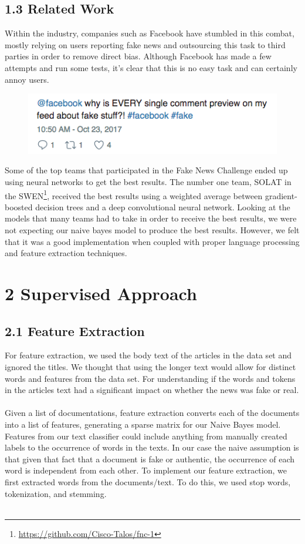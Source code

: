 \documentclass{neu_handout}
\begin{document}
\subsection*{1.3 Related Work}
Within the industry, companies such as Facebook have stumbled in this combat, mostly relying on users reporting fake news and outsourcing this task to third parties in order to remove direct bias. Although Facebook has made a few attempts and run some tests, it's clear that this is no easy task and can certainly annoy users.

\begin{figure}[h]
\centering
{
\includegraphics[width=0.3\linewidth]{fbfake}
}
\end{figure}

Some of the top teams that participated in the Fake News Challenge ended up using neural networks to get the best results. The number one team, SOLAT in the SWEN\footnote{\url{https://github.com/Cisco-Talos/fnc-1}}, received the best results using a weighted average between gradient-boosted decision trees and a deep convolutional neural network. Looking at the models that many teams had to take in order to receive the best results, we were not expecting our naive bayes model to produce the best results. However, we felt that it was a good implementation when coupled with proper language processing and feature extraction techniques.

\section*{2 Supervised Approach}

\subsection*{2.1 Feature Extraction}

For feature extraction, we used the body text of the articles in the data set and ignored the titles. We thought that using the longer text would allow for distinct words and features from the data set. For understanding if the words and tokens in the articles text had a significant impact on whether the news was fake or real.\\\\

Given a list of documentations, feature extraction converts each of the documents into a list of features, generating a sparse matrix for our Naive Bayes model. Features from our text classifier could include anything from manually created labels to the occurrence of words in the texts. In our case the naive assumption is that given that fact that a document is fake or authentic, the occurrence of each word is independent from each other. To implement our feature extraction, we first extracted words from the documents/text. To do this, we used stop words, tokenization, and stemming.\\\\
\end{document}
